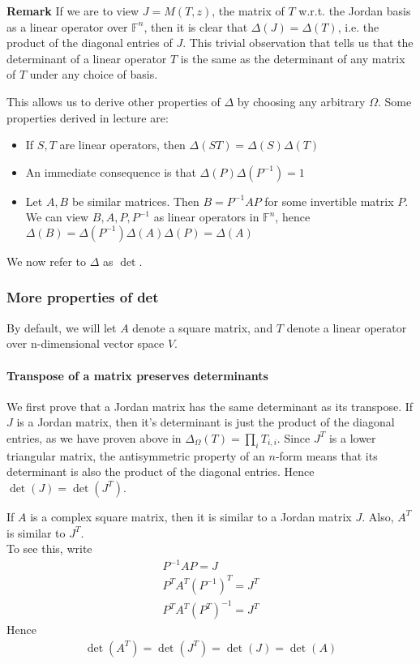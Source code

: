 \documentclass{article}
\begin{document}
\textbf{Remark} If we are to view $J=M(T,z)$, the matrix of $T$ w.r.t. the Jordan basis as a linear operator over $\mathbb{F}^n$, then it is clear that $\Delta(J)=\Delta(T)$, i.e. the product of the diagonal entries of $J$. This trivial observation that tells us that the determinant of a linear operator $T$ is the same as the determinant of any matrix of $T$ under any choice of basis.

This allows us to derive other properties of $\Delta$ by choosing any arbitrary $\Omega$. Some properties derived in lecture are:
\begin{itemize}
	\item If $S,T$ are linear operators, then $\Delta(ST) = \Delta(S)\Delta(T)$
	\item An immediate consequence is that $\Delta(P)\Delta(P^{-1})=1$
	\item Let $A, B$ be similar matrices. Then $B=P^{-1}AP$ for some invertible matrix $P$. We can view $B, A, P, P^{-1}$ as linear operators in $\mathbb{F}^n$, hence $\Delta(B)=
	\Delta(P^{-1})\Delta(A)\Delta(P)=\Delta(A)$
\end{itemize}

We now refer to $\Delta$ as $\det$.

\subsubsection{More properties of det}
By default, we will let $A$ denote a square matrix, and $T$ denote a linear operator over n-dimensional vector space $V$.
\paragraph{Transpose of a matrix preserves determinants}
We first prove that a Jordan matrix has the same determinant as its transpose.
If $J$ is a Jordan matrix, then it's determinant is just the product of the diagonal entries, as we have proven above in $\Delta_\Omega(T) = \prod_iT_{i,i}$. Since $J^T$ is a lower triangular matrix, the antisymmetric property of an $n$-form means that its determinant is also the product of the diagonal entries. Hence $\det(J)=\det(J^T)$.

If $A$ is a complex square matrix, then it is similar to a Jordan matrix $J$. Also, $A^T$ is similar to $J^T$.\\
To see this, write
\begin{align*}
	P^{-1}AP=J\\
	P^TA^T(P^{-1})^T=J^T\\
	P^TA^T(P^T)^{-1}=J^T
\end{align*}
Hence
\begin{align*}
	\det(A^T) = \det(J^T) = \det(J) = \det(A)
\end{align*}
\end{document}
